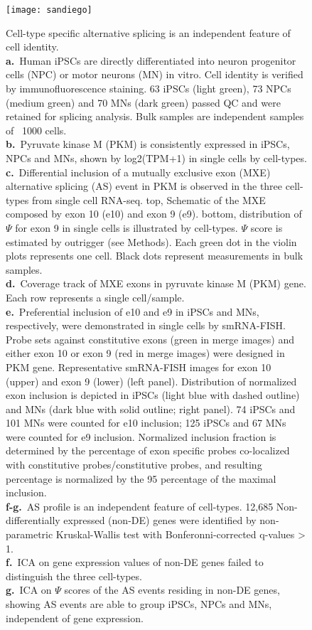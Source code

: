 \begin{figure}[h] 
  \centering
  \texttt{[image: sandiego]}
  \caption[Cell-type specific alternative splicing is an independent feature of cell identity.]{
  Cell-type specific alternative splicing is an independent feature of cell identity.\\
\textbf{a.}~Human iPSCs are directly differentiated into neuron progenitor cells (NPC) or motor neurons (MN) in vitro. Cell identity is verified by immunofluorescence staining. 63 iPSCs (light green), 73 NPCs (medium green) and 70 MNs (dark green) passed QC and were retained for splicing analysis. Bulk samples are independent samples of ~1000 cells.\\
\textbf{b.}~Pyruvate kinase M (PKM) is consistently expressed in iPSCs, NPCs and MNs, shown by log2(TPM+1) in single cells by cell-types.\\
\textbf{c.}~Differential inclusion of a mutually exclusive exon (MXE) alternative splicing (AS) event in PKM is observed in the three cell-types from single cell RNA-seq. top, Schematic of the MXE composed by exon 10 (e10) and exon 9 (e9). bottom, distribution of $\Psi$ for exon 9 in single cells is illustrated by cell-types. $\Psi$ score is estimated by outrigger (see Methods). Each green dot in the violin plots represents one cell. Black dots represent measurements in bulk samples.\\
\textbf{d.}~Coverage track of MXE exons in pyruvate kinase M (PKM) gene. Each row represents a single cell/sample. \\
\textbf{e.}~Preferential inclusion of e10 and e9 in iPSCs and MNs, respectively, were demonstrated in single cells by smRNA-FISH. Probe sets against constitutive exons (green in merge images) and either exon 10 or exon 9 (red in merge images) were designed in PKM gene. Representative smRNA-FISH images for exon 10 (upper) and exon 9 (lower) (left panel). Distribution of normalized exon inclusion is depicted in iPSCs (light blue with dashed outline) and MNs (dark blue with solid outline; right panel). 74 iPSCs and 101 MNs were counted for e10 inclusion; 125 iPSCs and 67 MNs were counted for e9 inclusion. Normalized inclusion fraction is determined by the percentage of exon specific probes co-localized with constitutive probes/constitutive probes, and resulting percentage is normalized by the 95 percentage of the maximal inclusion.\\
\textbf{f-g.}~AS profile is an independent feature of cell-types. 12,685 Non-differentially expressed (non-DE) genes were identified by non-parametric Kruskal-Wallis test with Bonferonni-corrected q-values > 1. \\
\textbf{f.}~ICA on gene expression values of non-DE genes failed to distinguish the three cell-types. \\
\textbf{g.}~ICA on $\Psi$ scores of the AS events residing in non-DE genes, showing AS events are able to group iPSCs, NPCs and MNs, independent of gene expression.
}
  \label{fig:system_overview}
\end{figure}

